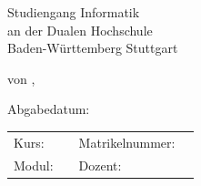 \documentclass[12pt]{report}
\begin{document}
 
	\begin{titlepage}
		\thispagestyle{titlepage}
		\newcommand\HRule{\rule{\textwidth}{1pt}} %

		
		\begin{center}
			
			\vspace*{2cm}
			
			\begin{spacing}{2}
				{ \huge \bfseries \MakeUppercase{\meinTitel}}
			\end{spacing}
			
			\vspace*{1.5cm}
			
			\Large \artDerArbeit
			
			\vspace*{3cm}
			
			{\LARGE Studiengang Informatik}\\
			{\LARGE an der Dualen Hochschule}\\
			{\LARGE Baden-Württemberg Stuttgart}\\

			\vspace*{2.5cm}
			
			\Large von \meinNameA , \meinNameS
			
			\vspace*{1.5cm}
			
			\Large Abgabedatum: \abgabeDatum

			\begin{table}[bp]
				\begin{tabular}{l l l l}
					Kurs: & \meinKurs & Matrikelnummer: & \meineMatrikelNr  \\
					Modul: & \modul & Dozent: & \dozent\\
				\end{tabular}
			\end{table}
			
			
		\end{center}
		
	\end{titlepage}



\fancypagestyle{plain}{
	\fancyfoot[L]{\meinNameA\\
		 \meinNameS}
	\fancyfoot[C]{Seite \thepage\ }%
	\fancyfoot[R]{\meinKurs\\
		\abgabeDatum
		}
}
\end{document}
